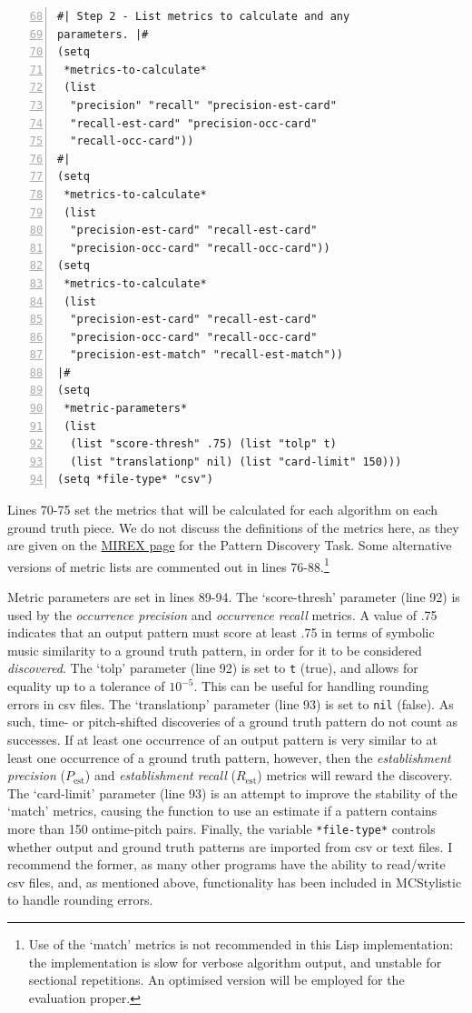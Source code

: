\begin{Verbatim}[frame=single,numbers=left,firstnumber=68]
#| Step 2 - List metrics to calculate and any
parameters. |#
(setq
 *metrics-to-calculate*
 (list
  "precision" "recall" "precision-est-card"
  "recall-est-card" "precision-occ-card"
  "recall-occ-card"))
#|
(setq
 *metrics-to-calculate*
 (list
  "precision-est-card" "recall-est-card"
  "precision-occ-card" "recall-occ-card"))
(setq
 *metrics-to-calculate*
 (list
  "precision-est-card" "recall-est-card"
  "precision-occ-card" "recall-occ-card"
  "precision-est-match" "recall-est-match"))
|#
(setq
 *metric-parameters*
 (list
  (list "score-thresh" .75) (list "tolp" t)
  (list "translationp" nil) (list "card-limit" 150)))
(setq *file-type* "csv")
\end{Verbatim}
Lines 70-75 set the metrics that will be calculated for each algorithm on each ground truth piece. We do not discuss the definitions of the metrics here, as they are given on the \href{http://www.music-ir.org/mirex/wiki/MIREX_HOME}{MIREX page} for the Pattern Discovery Task. Some alternative versions of metric lists are commented out in lines 76-88.\footnote{Use of the `match' metrics is not recommended in this Lisp implementation: the implementation is slow for verbose algorithm output, and unstable for sectional repetitions. An optimised version will be employed for the evaluation proper.}

Metric parameters are set in lines 89-94. The `score-thresh' parameter (line 92) is used by the \emph{occurrence precision} and \emph{occurrence recall} metrics. A value of .75 indicates that an output pattern must score at least .75 in terms of symbolic music similarity to a ground truth pattern, in order for it to be considered \emph{discovered}. The `tolp' parameter (line 92) is set to \texttt{t} (true), and allows for equality up to a tolerance of $10^{-5}$. This can be useful for handling rounding errors in csv files. The `translationp' parameter (line 93) is set to \texttt{nil} (false). As such, time- or pitch-shifted discoveries of a ground truth pattern do not count as successes. If at least one occurrence of an output pattern is very similar to at least one occurrence of a ground truth pattern, however, then the \emph{establishment precision} ($P_\text{est}$) and \emph{establishment recall} ($R_\text{est}$) metrics will reward the discovery. The `card-limit' parameter (line 93) is an attempt to improve the stability of the `match' metrics, causing the function  to use an estimate if a pattern contains more than 150 ontime-pitch pairs. Finally, the variable \texttt{*file-type*} controls whether output and ground truth patterns are imported from csv or text files. I recommend the former, as many other programs have the ability to read/write csv files, and, as mentioned above, functionality has been included in MCStylistic to handle rounding errors.


